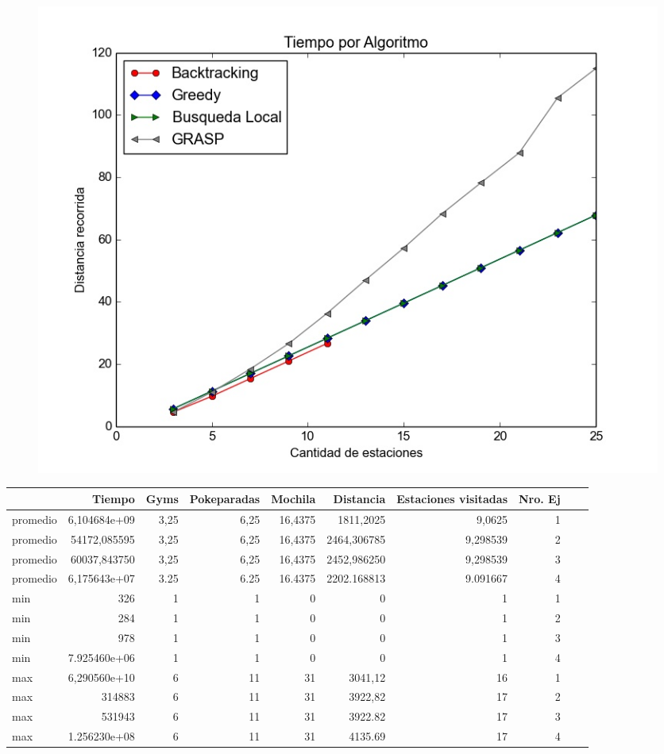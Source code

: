         \begin{figure}[H]
            \begin{center}
              \includegraphics[width=0.7\columnwidth]{imagenes/exp2_ej5_correctitud_solucion.jpeg}
              \caption{}
            \end{center}
        \end{figure}
      

\begin{tabular}{l | rrrrrrrrr}
\toprule
{} &        Tiempo &       Gyms &  Pokeparadas &     Mochila &    Distancia &  Estaciones visitadas &  Nro. Ej \\
\midrule
promedio  &  6,104684e+09 &   3,25     &    6,25     &   16,4375   &  1811,2025   &            9,0625   &      1 \\
promedio  &  54172,085595 &   3,25     &    6,25     &   16,4375   &  2464,306785 &            9,298539 &      2 \\
promedio  &  60037,843750 &   3,25     &    6,25     &   16,4375   &  2452,986250 &            9,298539 &      3 \\
promedio  &  6,175643e+07 &   3.25     &    6.25     &   16.4375   &  2202.168813 &            9.091667 &      4 \\
\hline
min   &  326          &   1        &    1        &   0         &  0           &            1        &      1 \\
min   &  284          &   1        &    1        &   0         &  0           &            1        &      2 \\
min   &  978          &   1        &    1        &   0         &  0           &            1        &      3 \\
min   &  7.925460e+06 &   1        &    1        &   0         &  0           &            1        &      4 \\
\hline
max   &  6,290560e+10 &   6        &    11       &   31        &  3041,12     &            16       &      1 \\
max   &  314883       &   6        &    11       &   31        &  3922,82     &            17       &      2 \\
max   &  531943       &   6        &    11       &   31        &  3922.82     &            17       &      3 \\
max   &  1.256230e+08 &   6        &    11       &   31        &  4135.69     &            17       &      4 \\
\bottomrule
\end{tabular}      


